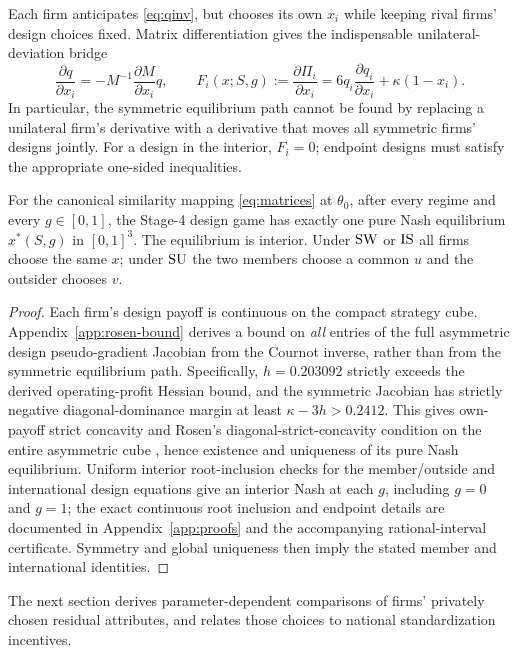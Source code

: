 Each firm anticipates \eqref{eq:qinv}, but chooses its own
$x_i$ while keeping rival firms' design choices fixed. Matrix
differentiation gives the indispensable unilateral-deviation
bridge
\begin{equation}\label{eq:design-bridge}
 \frac{\partial q}{\partial x_i}
 =-M^{-1}\frac{\partial M}{\partial x_i}q,\qquad
 F_i(x;S,g):=\frac{\partial\Pi_i}{\partial x_i}
 =6q_i\frac{\partial q_i}{\partial x_i}
       +\kappa(1-x_i).
\end{equation}
In particular, the symmetric equilibrium path cannot be
found by replacing a unilateral firm's derivative with a
derivative that moves all symmetric firms' designs jointly.
For a design in the interior, $F_i=0$; endpoint designs must
satisfy the appropriate one-sided inequalities.

\begin{lemma}
\label{lem:design}
For the canonical similarity mapping \eqref{eq:matrices}
at $\theta_0$, after every regime and every $g\in[0,1]$,
the Stage-4 design game has exactly one pure Nash equilibrium
$x^*(S,g)$ in $[0,1]^3$. The equilibrium is interior. Under
$\mathrm{SW}$ or $\mathrm{IS}$ all firms choose the same $x$; under $\mathrm{SU}$ the
two members choose a common $u$ and the outsider chooses $v$.
\end{lemma}
\begin{proof}
Each firm's design payoff is continuous on the compact
strategy cube. Appendix~\ref{app:rosen-bound} derives a
bound on \emph{all} entries of the full asymmetric
design pseudo-gradient Jacobian from the Cournot
inverse, rather than from the symmetric equilibrium
path. Specifically, $h=0.203092$ strictly exceeds
the derived operating-profit Hessian bound, and the
symmetric Jacobian has strictly negative
diagonal-dominance margin at least
$\kappa-3h>0.2412$.
This gives own-payoff strict concavity and Rosen's
diagonal-strict-concavity condition on the entire
asymmetric cube \citep{Rosen1965}, hence
existence and uniqueness of its pure Nash equilibrium.
Uniform interior root-inclusion checks for the member/outside
and international design equations give an interior Nash at
each $g$, including $g=0$ and $g=1$; the exact continuous
root inclusion and endpoint details are documented in
Appendix~\ref{app:proofs} and the accompanying
rational-interval certificate. Symmetry and global uniqueness
then imply the stated member and international identities.
\end{proof}

The next section derives parameter-dependent comparisons of
firms' privately chosen residual attributes, and relates
those choices to national standardization incentives.


